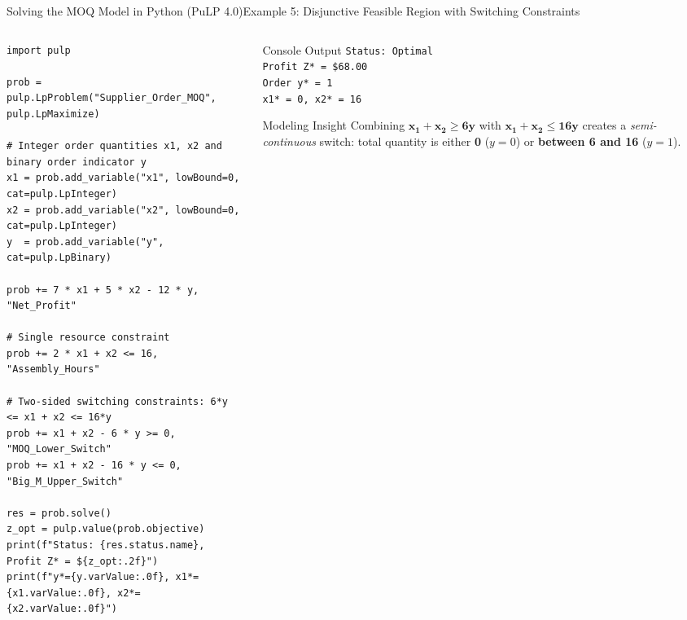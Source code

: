 \documentclass[aspectratio=169]{beamer}
\begin{document}
\begin{frame}[fragile]{Solving the MOQ Model in Python (PuLP 4.0)}{Example 5: Disjunctive Feasible Region with Switching Constraints}
\begin{columns}[T]
\begin{column}{0.58\textwidth}
\begin{lstlisting}
import pulp

prob = pulp.LpProblem("Supplier_Order_MOQ", pulp.LpMaximize)

# Integer order quantities x1, x2 and binary order indicator y
x1 = prob.add_variable("x1", lowBound=0, cat=pulp.LpInteger)
x2 = prob.add_variable("x2", lowBound=0, cat=pulp.LpInteger)
y  = prob.add_variable("y", cat=pulp.LpBinary)

prob += 7 * x1 + 5 * x2 - 12 * y, "Net_Profit"

# Single resource constraint
prob += 2 * x1 + x2 <= 16, "Assembly_Hours"

# Two-sided switching constraints: 6*y <= x1 + x2 <= 16*y
prob += x1 + x2 - 6 * y >= 0, "MOQ_Lower_Switch"
prob += x1 + x2 - 16 * y <= 0, "Big_M_Upper_Switch"

res = prob.solve()
z_opt = pulp.value(prob.objective)
print(f"Status: {res.status.name}, Profit Z* = ${z_opt:.2f}")
print(f"y*={y.varValue:.0f}, x1*={x1.varValue:.0f}, x2*={x2.varValue:.0f}")
\end{lstlisting}
\end{column}
\begin{column}{0.39\textwidth}
\begin{block}{Console Output}
\footnotesize
\texttt{Status: Optimal}\\
\texttt{Profit Z* = \$68.00}\\
\texttt{Order y* = 1}\\
\texttt{x1* = 0, x2* = 16}
\end{block}
\begin{alertblock}{Modeling Insight}
\scriptsize
Combining $\mathbf{x_1 + x_2 \ge 6y}$ with $\mathbf{x_1 + x_2 \le 16y}$ creates a \textit{semi-continuous} switch: total quantity is either \textbf{0} ($y=0$) or \textbf{between 6 and 16} ($y=1$).
\end{alertblock}
\end{column}
\end{columns}
\end{frame}
\end{document}
